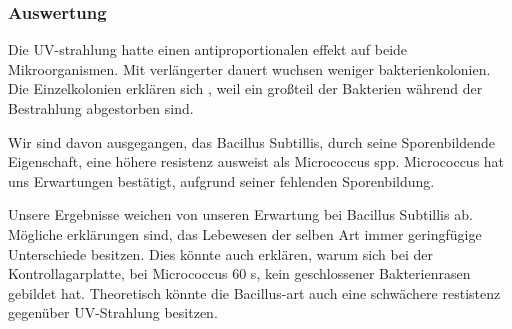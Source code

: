 \subsubsection{Auswertung}
\label{sec:Exp-UV-A}


Die UV-strahlung hatte einen antiproportionalen effekt auf beide Mikroorganismen.
Mit verlängerter dauert wuchsen weniger bakterienkolonien.
Die Einzelkolonien erklären sich , weil ein großteil der Bakterien während der Bestrahlung abgestorben sind.\par

Wir sind davon ausgegangen, das Bacillus Subtillis, durch seine Sporenbildende Eigenschaft,
eine höhere resistenz ausweist als Micrococcus spp.
Micrococcus hat uns Erwartungen bestätigt, aufgrund seiner fehlenden Sporenbildung.
\par
Unsere Ergebnisse weichen von unseren Erwartung bei Bacillus Subtillis ab.
Mögliche erklärungen sind, das Lebewesen der selben Art immer geringfügige Unterschiede besitzen.
Dies könnte auch erklären, warum sich bei der Kontrollagarplatte, bei Micrococcus 60 s, kein geschlossener Bakterienrasen gebildet hat.
Theoretisch könnte die Bacillus-art auch eine schwächere restistenz gegenüber UV-Strahlung besitzen.
%